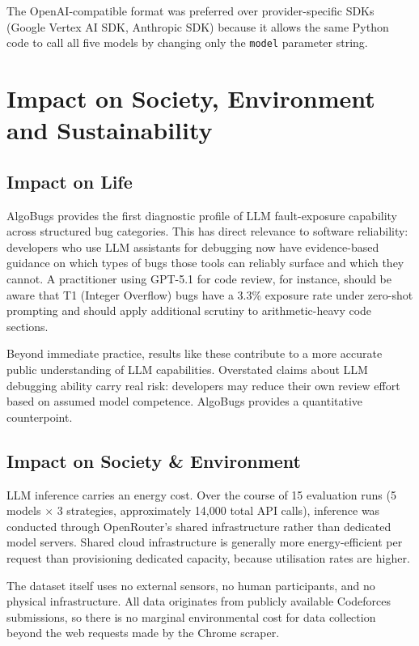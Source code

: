 The OpenAI-compatible format was preferred over provider-specific SDKs (Google Vertex AI SDK, Anthropic SDK) because it allows the same Python code to call all five models by changing only the \texttt{model} parameter string.

\section{Impact on Society, Environment and Sustainability}

\subsection{Impact on Life}

AlgoBugs provides the first diagnostic profile of LLM fault-exposure capability across structured bug categories. This has direct relevance to software reliability: developers who use LLM assistants for debugging now have evidence-based guidance on which types of bugs those tools can reliably surface and which they cannot. A practitioner using GPT-5.1 for code review, for instance, should be aware that T1 (Integer Overflow) bugs have a 3.3\% exposure rate under zero-shot prompting and should apply additional scrutiny to arithmetic-heavy code sections.

Beyond immediate practice, results like these contribute to a more accurate public understanding of LLM capabilities. Overstated claims about LLM debugging ability carry real risk: developers may reduce their own review effort based on assumed model competence. AlgoBugs provides a quantitative counterpoint.

\subsection{Impact on Society \& Environment}

LLM inference carries an energy cost. Over the course of 15 evaluation runs (5 models $\times$ 3 strategies, approximately 14,000 total API calls), inference was conducted through OpenRouter's shared infrastructure rather than dedicated model servers. Shared cloud infrastructure is generally more energy-efficient per request than provisioning dedicated capacity, because utilisation rates are higher.

The dataset itself uses no external sensors, no human participants, and no physical infrastructure. All data originates from publicly available Codeforces submissions, so there is no marginal environmental cost for data collection beyond the web requests made by the Chrome scraper.

